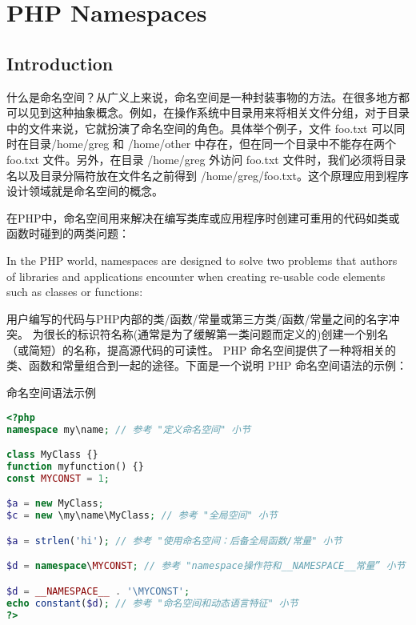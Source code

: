 \part{PHP Namespaces}


\chapter{Introduction}


什么是命名空间？从广义上来说，命名空间是一种封装事物的方法。在很多地方都可以见到这种抽象概念。例如，在操作系统中目录用来将相关文件分组，对于目录中的文件来说，它就扮演了命名空间的角色。具体举个例子，文件 foo.txt 可以同时在目录/home/greg 和 /home/other 中存在，但在同一个目录中不能存在两个 foo.txt 文件。另外，在目录 /home/greg 外访问 foo.txt 文件时，我们必须将目录名以及目录分隔符放在文件名之前得到 /home/greg/foo.txt。这个原理应用到程序设计领域就是命名空间的概念。

在PHP中，命名空间用来解决在编写类库或应用程序时创建可重用的代码如类或函数时碰到的两类问题：

 
 
In the PHP world, namespaces are designed to solve two problems that authors of libraries and applications encounter when creating re-usable code elements such as classes or functions:

用户编写的代码与PHP内部的类/函数/常量或第三方类/函数/常量之间的名字冲突。
为很长的标识符名称(通常是为了缓解第一类问题而定义的)创建一个别名（或简短）的名称，提高源代码的可读性。
PHP 命名空间提供了一种将相关的类、函数和常量组合到一起的途径。下面是一个说明 PHP 命名空间语法的示例：

\begin{example}
命名空间语法示例
\begin{lstlisting}[language=PHP]
<?php
namespace my\name; // 参考 "定义命名空间" 小节

class MyClass {}
function myfunction() {}
const MYCONST = 1;

$a = new MyClass;
$c = new \my\name\MyClass; // 参考 "全局空间" 小节

$a = strlen('hi'); // 参考 "使用命名空间：后备全局函数/常量" 小节

$d = namespace\MYCONST; // 参考 "namespace操作符和__NAMESPACE__常量” 小节

$d = __NAMESPACE__ . '\MYCONST';
echo constant($d); // 参考 "命名空间和动态语言特征" 小节
?>
\end{lstlisting}
\end{example}

